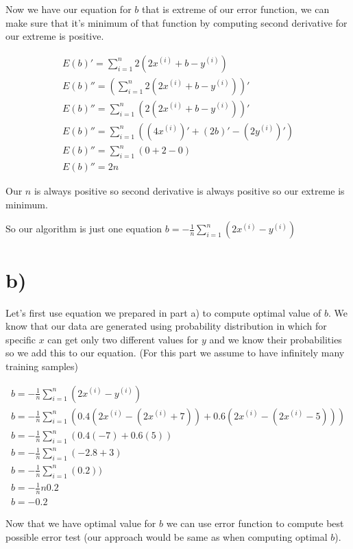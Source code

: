 \documentclass[a4paper]{article}
\begin{document}
Now we have our equation for $b$ that is extreme of our error function, we can make sure that it's minimum of that function by computing second derivative for our extreme is positive.

\begin{align*}
	E(b)'=\sum_{i=1}^{n}2(2x^{(i)}+b - y^{(i)})
	\\
	E(b)''=(\sum_{i=1}^{n}2(2x^{(i)}+b - y^{(i)}))'
	\\
	E(b)''=\sum_{i=1}^{n}(2(2x^{(i)}+b - y^{(i)}))'
	\\
	E(b)''=\sum_{i=1}^{n}((4x^{(i)})' + (2b)' - (2y^{(i)})')
	\\
	E(b)''=\sum_{i=1}^{n}(0 + 2 - 0)
	\\
	E(b)''=2n
\end{align*}

Our $n$ is always positive so second derivative is always positive so our extreme is minimum.

So our algorithm is just one equation $b = - \frac{1}{n}\sum_{i=1}^{n}(2x^{(i)} - y^{(i)})$

\section{b)}

Let's first use equation we prepared in part a) to compute optimal value of $b$. We know that our data are generated using probability distribution in which for specific $x$ can get only two different values for $y$ and we know their probabilities so we add this to our equation. (For this part we assume to have infinitely many training samples)

\begin{align*}
	b = - \frac{1}{n}\sum_{i=1}^{n}(2x^{(i)} - y^{(i)})
	\\
	b = - \frac{1}{n}\sum_{i=1}^{n}(0.4(2x^{(i)} - (2x^{(i)}+7)) + 0.6(2x^{(i)} - (2x^{(i)}-5)))
	\\
	b = - \frac{1}{n}\sum_{i=1}^{n}(0.4(-7) + 0.6(5))
	\\
	b = - \frac{1}{n}\sum_{i=1}^{n}(-2.8 + 3)
	\\
	b = - \frac{1}{n}\sum_{i=1}^{n}(0.2))
	\\
	b = -\frac{1}{n}n0.2
	\\ 
	b = -0.2
\end{align*}

Now that we have optimal value for $b$ we can use error function to compute best possible error test (our approach would be same as when computing optimal $b$).
\end{document}
